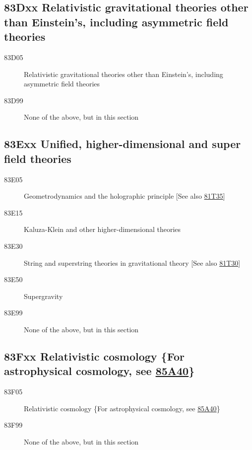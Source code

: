 \subsection*{83Dxx  Relativistic gravitational theories other than Einstein's, including asymmetric field theories }\label{83Dxx}
\begin{description}  
\item [83D05]\label{83D05} Relativistic gravitational theories other than Einstein's, including asymmetric field theories
\item [83D99]\label{83D99} None of the above, but in this section
\end{description}
\subsection*{83Exx  Unified, higher-dimensional and super field theories }\label{83Exx}
\begin{description}  
\item [83E05]\label{83E05} Geometrodynamics and the holographic principle [See also \hyperref[81T35]{81T35}]
\item [83E15]\label{83E15} Kaluza-Klein and other higher-dimensional theories
\item [83E30]\label{83E30} String and superstring theories in gravitational theory [See also \hyperref[81T30]{81T30}]
\item [83E50]\label{83E50} Supergravity
\item [83E99]\label{83E99} None of the above, but in this section
\end{description}
\subsection*{83Fxx  Relativistic cosmology \{For astrophysical cosmology, see \hyperref[85A40]{85A40}\} }\label{83Fxx}
\begin{description}  
\item [83F05]\label{83F05} Relativistic cosmology \{For astrophysical cosmology, see \hyperref[85A40]{85A40}\}
\item [83F99]\label{83F99} None of the above, but in this section
\end{description}
